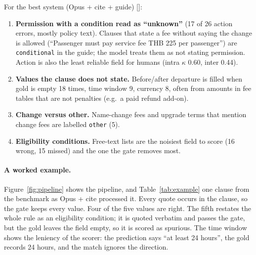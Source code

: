 \documentclass[11pt,a4paper]{article}
\newcommand{\res}[1]{{\small[\path{#1}]}}
\begin{document}
For the best system (Opus + cite + guide) \res{results/v1c_error_analysis.json}:
\begin{enumerate}
  \item \textbf{Permission with a condition read as ``unknown''} (17 of 26 action errors, mostly policy text). Clauses that state a fee without saying the change is allowed (``Passenger must pay service fee THB 225 per passenger'') are \texttt{conditional} in the guide; the model treats them as not stating permission. Action is also the least reliable field for humans (intra $\kappa$ 0.60, inter 0.44).
  \item \textbf{Values the clause does not state.} Before/after departure is filled when gold is empty 18 times, time window 9, currency 8, often from amounts in fee tables that are not penalties (e.g.\ a paid refund add-on).
  \item \textbf{Change versus other.} Name-change fees and upgrade terms that mention change fees are labelled \texttt{other} (5).
  \item \textbf{Eligibility conditions.} Free-text lists are the noisiest field to score (16 wrong, 15 missed) and the one the gate removes most.
\end{enumerate}

\paragraph{A worked example.}\label{sec:example} Figure~\ref{fig:pipeline} shows the pipeline, and Table~\ref{tab:example} one clause from the benchmark as Opus + cite processed it. Every quote occurs in the clause, so the gate keeps every value. Four of the five values are right. The fifth restates the whole rule as an eligibility condition; it is quoted verbatim and passes the gate, but the gold leaves the field empty, so it is scored as spurious. The time window shows the leniency of the scorer: the prediction says ``at least 24 hours'', the gold records 24 hours, and the match ignores the direction.
\end{document}
